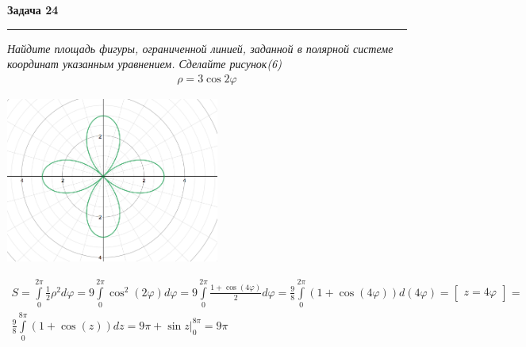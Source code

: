 \documentclass[a4paper,11pt]{article}
\begin{document}
\textbf{\large Задача 24}
\medskip\hrule\medskip
\textit{Найдите площадь фигуры, ограниченной линией, заданной в полярной системе координат указанным уравнением. Сделайте рисунок(6)}
\begin{align*}
\rho = 3 \cos 2\varphi
\end{align*}
\begin{center}
	\includegraphics[width = 70mm]{images/241.png}
\end{center}
\begin{gather*}
S = \int\limits_{0}^{2\pi} \frac12 \rho^2 d\varphi = 
9\int\limits_{0}^{2\pi} \cos^2 (2\varphi)  d\varphi = 
9\int\limits_{0}^{2\pi} \frac{1 + \cos(4 \varphi)}2 d\varphi = 
\frac98\int\limits_{0}^{2\pi} (1 + \cos(4 \varphi)) d(4\varphi) = 
\begin{bmatrix} z = 4 \varphi \end{bmatrix} =\\[2pt]
\frac98\int\limits_{0}^{8\pi} (1 + \cos(z)) dz = 9\pi + \sin z \big |_{0}^{8\pi} = 9\pi
\end{gather*}
\newpage



\end{document}
